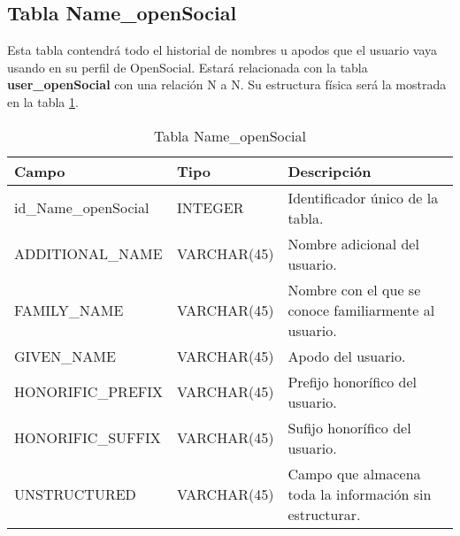 \subsection{Tabla Name\_openSocial}
Esta tabla contendrá todo el historial de nombres u apodos que el usuario vaya usando en su perfil de OpenSocial. Estará relacionada con la tabla \textbf{user\_openSocial} con una relación N a N. Su estructura física será la mostrada en la tabla \ref{tabNameOpenSocial}.
\bigskip
\par
\begin{table}
\begin{center}
\begin{tabular}{| l | l | p{60mm} |}\hline
\textbf{Campo}&\textbf{Tipo}&\textbf{Descripción} \\ \hline
id\_Name\_openSocial & INTEGER & Identificador único de la tabla. \\ \hline
ADDITIONAL\_NAME & VARCHAR(45) & Nombre adicional del usuario. \\ \hline
FAMILY\_NAME & VARCHAR(45) & Nombre con el que se conoce familiarmente al usuario. \\ \hline
GIVEN\_NAME & VARCHAR(45) & Apodo del usuario. \\ \hline
HONORIFIC\_PREFIX & VARCHAR(45) & Prefijo honorífico del usuario. \\ \hline
HONORIFIC\_SUFFIX & VARCHAR(45) & Sufijo honorífico del usuario. \\ \hline
UNSTRUCTURED & VARCHAR(45) & Campo que almacena toda la información sin estructurar. \\ \hline
\end{tabular}
\end{center}
\caption{Tabla Name\_openSocial} \label{tabNameOpenSocial}
\end{table}

